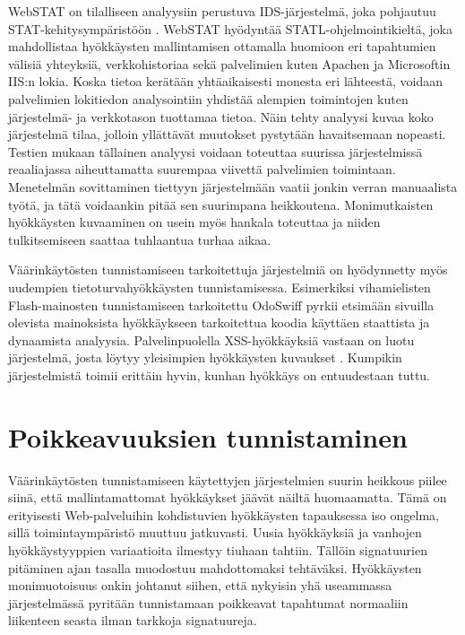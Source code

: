 WebSTAT \cite{Webstat} on tilalliseen analyysiin perustuva IDS-järjestelmä, joka pohjautuu STAT-kehitysympäristöön \cite{STAT}. WebSTAT hyödyntää STATL-ohjelmointikieltä, joka mahdollistaa hyökkäysten
mallintamisen ottamalla huomioon eri tapahtumien välisiä yhteyksiä, verkkohistoriaa sekä palvelimien kuten Apachen ja Microsoftin IIS:n lokia. Koska tietoa kerätään yhtäaikaisesti monesta eri 
lähteestä, voidaan palvelimien lokitiedon analysointiin yhdistää alempien toimintojen kuten jär\-jes\-tel\-mä- ja verkkotason tuottamaa tietoa. Näin tehty analyysi kuvaa koko järjestelmä tilaa, jolloin 
yllättävät muutokset pystytään havaitsemaan nopeasti. Testien mukaan tällainen analyysi voidaan toteuttaa suurissa järjestelmissä reaaliajassa aiheuttamatta suurempaa viivettä palvelimien toimintaan. 
Menetelmän sovittaminen tiettyyn järjestelmään vaatii jonkin verran manuaalista työtä, ja tätä voidaankin pitää sen suurimpana heikkoutena. Monimutkaisten hyökkäysten kuvaaminen on usein myös hankala
toteuttaa ja niiden tulkitsemiseen saattaa tuhlaantua turhaa aikaa.

Väärinkäytösten tunnistamiseen tarkoitettuja järjestelmiä on hyödynnetty myös uudempien tietoturvahyökkäysten tunnistamisessa. Esimerkiksi vihamielisten Flash-mainosten tunnistamiseen tarkoitettu 
OdoSwiff \cite{FlashAdd} pyrkii etsimään sivuilla olevista mainoksista hyökkäykseen tarkoitettua koodia käyttäen staattista ja dynaamista analyysia. Palvelinpuolella XSS-hyökkäyksiä vastaan on luotu 
järjestelmä, josta löytyy yleisimpien hyökkäysten kuvaukset \cite{SignatureXSS}. Kumpikin järjestelmistä toimii erittäin hyvin, kunhan hyökkäys on entuudestaan tuttu.

\section{Poikkeavuuksien tunnistaminen}


Väärinkäytösten tunnistamiseen käytettyjen järjestelmien suurin heikkous piilee siinä, että mallintamattomat hyökkäykset jäävät näiltä huomaamatta. Tämä on erityisesti Web-palveluihin kohdistuvien
hyökkäysten tapauksessa iso ongelma, sillä toimintaympäristö muuttuu
jatkuvasti. Uusia hyökkäyksiä ja vanhojen hyökkäystyyppien variaatioita ilmestyy tiuhaan tahtiin. Tällöin signatuurien pitäminen ajan tasalla
muodostuu mahdottomaksi tehtäväksi. Hyökkäysten monimuotoisuus onkin johtanut siihen, että nykyisin yhä useammassa järjestelmässä pyritään tunnistamaan poikkeavat tapahtumat normaaliin liikenteen seasta
ilman tarkkoja signatuureja. 

